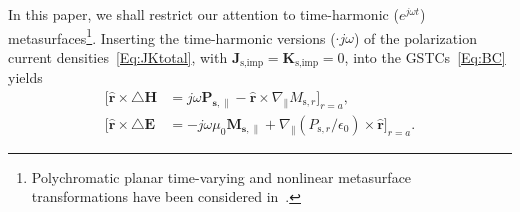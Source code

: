 \documentclass[journal,transaction]{IEEEtran}
\newcommand{\ve}[1]{\mathbf{#1}}
\newcommand{\uve}[1]{\mathbf{\hat{#1}}}
\begin{document}
In this paper, we shall restrict our attention to time-harmonic ($e^{j\omega t}$) metasurfaces\footnote{Polychromatic planar time-varying and nonlinear metasurface transformations have been considered in~\cite{Nimaspacetime, KA_nonlinear_2017}.}. Inserting the time-harmonic versions ($\cdot j\omega$) of the polarization current densities~\eqref{Eq:JKtotal}, with $\ve{J}_\text{s,imp}=\ve{K}_\text{s,imp}=0$, into the GSTCs~\eqref{Eq:BC} yields
%
 \begin{subequations}\label{Eq:GSTC_two_media_JK}
\begin{align}
[\uve{r}\times\triangle\ve{H}&=j\omega\ve{P_{\text{s},\|}}-\uve{r}\times\nabla_{\|}M_{\text{s},r}]_{r=a},\\
[\uve{r}\times\triangle\ve{E}&=-j\omega\mu_0\ve{M_{\text{s},\|}}+\nabla_{\|}(P_{\text{s},r}/\epsilon_0)\times\uve{r}]_{r=a}.
\end{align}
\end{subequations}
\end{document}
